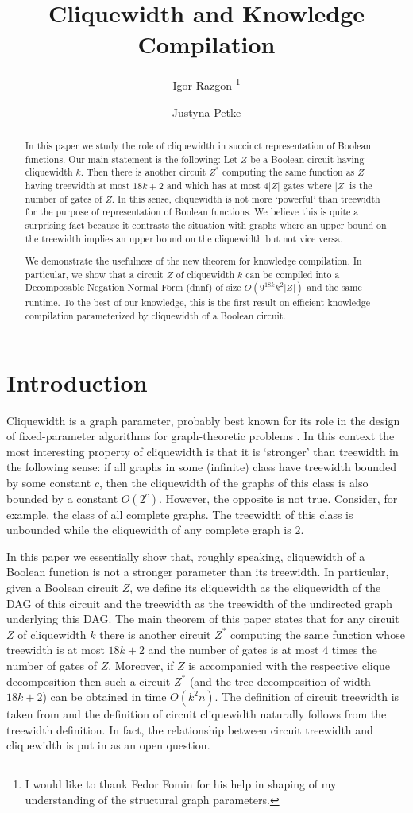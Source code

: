 \documentclass{llncs}
\title{Cliquewidth and Knowledge Compilation}
\author{Igor Razgon \thanks{I would like to thank Fedor Fomin for his help in shaping
of my understanding of the structural graph parameters.}\inst{1} \and Justyna Petke \inst{2}}
\institute{
Department of Computer Science and Information Systems, \\ 
Birkbeck, University of London \email{igor@dcs.bbk.ac.uk} \and
Department of Computer Science, \\ University College London
\email{J.Petke@cs.ucl.ac.uk} 
}
\begin{document}
\maketitle
\begin{abstract}
In this paper we study the role of cliquewidth in succinct representation of Boolean
functions. Our main statement is the following: Let $Z$ be a Boolean circuit having
cliquewidth $k$. Then there is another circuit $Z^*$ computing the same function as $Z$
having treewidth at most $18k+2$ and which has at most $4|Z|$ gates where $|Z|$ is the number of gates of $Z$. 
In this sense, cliquewidth is not more `powerful' than
treewidth for the purpose of representation of Boolean functions. We believe this is quite 
a surprising fact because it contrasts the situation with graphs where an upper bound on the 
treewidth implies an upper bound on the cliquewidth but not vice versa.

We demonstrate the usefulness of the new theorem for knowledge compilation.
In particular, we show that a circuit $Z$ of cliquewidth $k$ can be compiled into a Decomposable
Negation Normal Form ({\sc dnnf}) of size $O(9^{18k}k^2|Z|)$ and the same runtime. To the best of our knowledge, 
this is the first result on efficient knowledge compilation parameterized by cliquewidth of a 
Boolean circuit. 
\end{abstract}
\section{Introduction}
Cliquewidth is a graph parameter, probably best known for its role in the design of fixed-parameter algorithms
for graph-theoretic problems \cite{CoMaRo}. In this context the most interesting property of cliquewidth is that it
is `stronger' than treewidth in the following sense: if all graphs in some (infinite) class have treewidth bounded by some
constant $c$, then the cliquewidth of the graphs of this class is also bounded by a constant $O(2^c)$. However, the
opposite is not true. Consider, for example, the class of all complete graphs. The treewidth of this class is unbounded
while the cliquewidth of any complete graph is $2$. 


In this paper we essentially show that, roughly speaking, cliquewidth of a Boolean function is not
a stronger parameter than its treewidth. In particular, given a Boolean circuit $Z$, we define its cliquewidth
as the cliquewidth of the DAG of this circuit and the treewidth as the treewidth of the undirected graph 
underlying this DAG. The main theorem of this paper states that for any circuit $Z$ of cliquewidth $k$ there is
another circuit $Z^*$ computing the same function whose treewidth is at most $18k+2$ and the number of gates is at most
$4$ times the number of gates of $Z$. Moreover, if $Z$ is accompanied with the respective clique decomposition then
such a circuit $Z^*$ (and the tree decomposition of width $18k+2$) can be obtained in time $O(k^2n)$.
The definition of circuit treewidth is taken from \cite{OBDDTWJha} and the definition of circuit cliquewidth naturally
follows from the treewidth definition. In fact, the relationship between circuit treewidth and cliquewidth is 
put in \cite{OBDDTWJha} as an open question.
\end{document}
